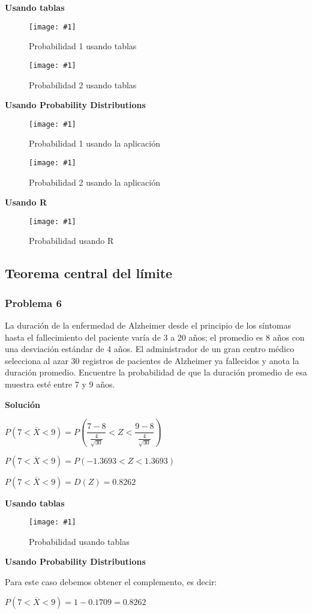 \documentclass{mylib/reporte}
\newcommand{\insertImage}[3]{
	\begin{figure}[H]
		\centering
		\texttt{[image: \#1]}
		\caption{#2}
	\end{figure}
}
\begin{document}
	\textbf{Usando tablas}

	\insertImage{img/estad_t5/dne_5a}{Probabilidad 1 usando tablas}{5}

	\insertImage{img/estad_t5/dne_5aa}{Probabilidad 2 usando tablas}{5}

	\textbf{Usando Probability Distributions}

	\insertImage{img/estad_t5/dne_5b}{Probabilidad 1 usando la aplicación}{7}

	\insertImage{img/estad_t5/dne_5bb}{Probabilidad 2 usando la aplicación}{7}

	\textbf{Usando R}

	\insertImage{img/estad_t5/dne_5c}{Probabilidad usando R}{10}


\subsection{Teorema central del límite}

\subsubsection{Problema 6}
La duración de la enfermedad de Alzheimer desde el principio de los síntomas
hasta el fallecimiento del paciente varía de 3 a 20 años; el promedio es 8 años
con una desviación estándar de 4 años. El administrador de un gran centro
médico selecciona al azar 30 registros de pacientes de Alzheimer ya fallecidos y
anota la duración promedio. Encuentre la probabilidad de que la duración
promedio de esa muestra esté entre 7 y 9 años.

	\textbf{Solución}

		$P(7 < \overline{X} < 9) = P \left( \dfrac{7-8}{\frac{4}{\sqrt{30}}} < Z < \dfrac{9-8}{\frac{4}{\sqrt{30}}} \right)$

		$ P(7 < \overline{X} < 9) = P(-1.3693 < Z < 1.3693	 )$

		$P(7 < \overline{X} < 9) = D(Z) = 0.8262$

	\textbf{Usando tablas}

		\insertImage{img/estad_t5/dne_6a}{Probabilidad usando tablas}{5}

	\textbf{Usando Probability Distributions}

		Para este caso debemos obtener el complemento, es decir:

		$P(7 < \overline{X} < 9) = 1- 0.1709 = 0.8262$
\end{document}

